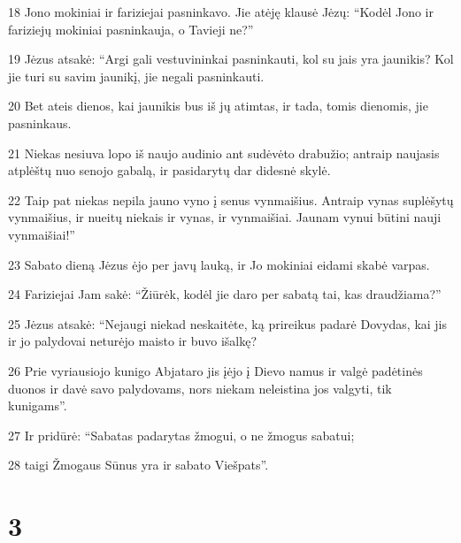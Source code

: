 \par 18 Jono mokiniai ir fariziejai pasninkavo. Jie atėję klausė Jėzų: “Kodėl Jono ir fariziejų mokiniai pasninkauja, o Tavieji ne?” 
\par 19 Jėzus atsakė: “Argi gali vestuvininkai pasninkauti, kol su jais yra jaunikis? Kol jie turi su savim jaunikį, jie negali pasninkauti. 
\par 20 Bet ateis dienos, kai jaunikis bus iš jų atimtas, ir tada, tomis dienomis, jie pasninkaus. 
\par 21 Niekas nesiuva lopo iš naujo audinio ant sudėvėto drabužio; antraip naujasis atplėštų nuo senojo gabalą, ir pasidarytų dar didesnė skylė. 
\par 22 Taip pat niekas nepila jauno vyno į senus vynmaišius. Antraip vynas suplėšytų vynmaišius, ir nueitų niekais ir vynas, ir vynmaišiai. Jaunam vynui būtini nauji vynmaišiai!” 
\par 23 Sabato dieną Jėzus ėjo per javų lauką, ir Jo mokiniai eidami skabė varpas. 
\par 24 Fariziejai Jam sakė: “Žiūrėk, kodėl jie daro per sabatą tai, kas draudžiama?” 
\par 25 Jėzus atsakė: “Nejaugi niekad neskaitėte, ką prireikus padarė Dovydas, kai jis ir jo palydovai neturėjo maisto ir buvo išalkę? 
\par 26 Prie vyriausiojo kunigo Abjataro jis įėjo į Dievo namus ir valgė padėtinės duonos ir davė savo palydovams, nors niekam neleistina jos valgyti, tik kunigams”. 
\par 27 Ir pridūrė: “Sabatas padarytas žmogui, o ne žmogus sabatui; 
\par 28 taigi Žmogaus Sūnus yra ir sabato Viešpats”.



\chapter{3}



